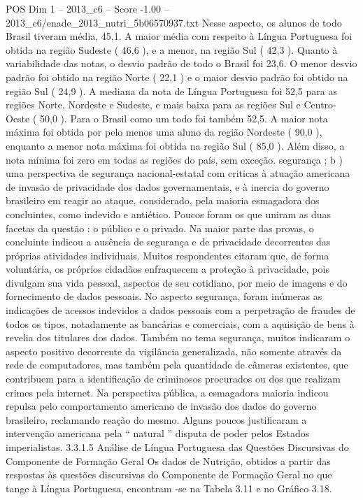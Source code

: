 \begin{textsample}{POS Dim 1 – 2013\_c6 – Score -1.00 – 2013\_c6/enade\_2013\_nutri\_5b06570937.txt}
Nesse aspecto, os alunos de todo Brasil tiveram média, 45,1.
A maior média com respeito à Língua Portuguesa foi obtida na região Sudeste ( 46,6 ), e a menor, na região Sul ( 42,3 ).
Quanto à variabilidade das notas, o desvio padrão de todo o Brasil foi 23,6.
O menor desvio padrão foi obtido na região Norte ( 22,1 ) e o maior desvio padrão foi obtido na região Sul ( 24,9 ).
A mediana da nota de Língua Portuguesa foi 52,5 para as regiões Norte, Nordeste e Sudeste, e mais baixa para as regiões Sul e Centro-Oeste ( 50,0 ).
Para o Brasil como um todo foi também 52,5.
A maior nota máxima foi obtida por pelo menos uma aluno da região Nordeste ( 90,0 ), enquanto a menor nota máxima foi obtida na região Sul ( 85,0 ).
Além disso, a nota mínima foi zero em todas as regiões do país, sem exceção. segurança ; b ) uma perspectiva de segurança nacional-estatal com criticas à atuação americana de invasão de privacidade dos dados governamentais, e à inercia do governo brasileiro em reagir ao ataque, considerado, pela maioria esmagadora dos concluintes, como indevido e antiético.
Poucos foram os que uniram as duas facetas da questão : o público e o privado.
Na maior parte das provas, o concluinte indicou a ausência de segurança e de privacidade decorrentes das próprias atividades individuais.
Muitos respondentes citaram que, de forma voluntária, os próprios cidadãos enfraquecem a proteção à privacidade, pois divulgam sua vida pessoal, aspectos de seu cotidiano, por meio de imagens e do fornecimento de dados pessoais.
No aspecto segurança, foram inúmeras as indicações de acessos indevidos a dados pessoais com a perpetração de fraudes de todos os tipos, notadamente as bancárias e comerciais, com a aquisição de bens à revelia dos titulares dos dados.
Também no tema segurança, muitos indicaram o aspecto positivo decorrente da vigilância generalizada, não somente através da rede de computadores, mas também pela quantidade de câmeras existentes, que contribuem para a identificação de criminosos procurados ou dos que realizam crimes pela internet.
Na perspectiva pública, a esmagadora maioria indicou repulsa pelo comportamento americano de invasão dos dados do governo brasileiro, reclamando reação do mesmo.
Alguns poucos justificaram a intervenção americana pela “ natural ” disputa de poder pelos Estados imperialistas. 3.3.1.5 Análise de Língua Portuguesa das Questões Discursivas do Componente de Formação Geral Os dados de Nutrição, obtidos a partir das respostas às questões discursivas do Componente de Formação Geral no que tange à Língua Portuguesa, encontram -se na Tabela 3.11 e no Gráfico 3.18.

\end{textsample}
